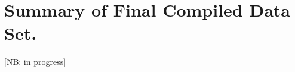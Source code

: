 \section{Summary of Final Compiled Data Set.}
\label{sec:SI_data_summary}

[NB: in progress]


%
%

%
